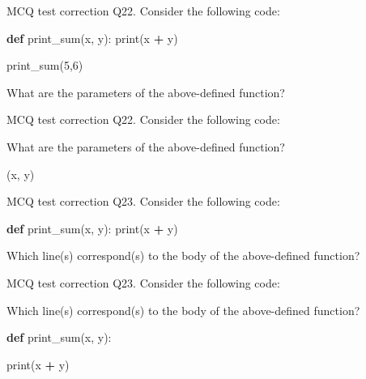 \documentclass[
  8pt,
  ignorenonframetext,
]{beamer}
\newenvironment{Shaded}{\begin{snugshade}}{\end{snugshade}}
\newcommand{\BuiltInTok}[1]{#1}
\newcommand{\DecValTok}[1]{\textcolor[rgb]{0.00,0.00,0.81}{#1}}
\newcommand{\KeywordTok}[1]{\textcolor[rgb]{0.13,0.29,0.53}{\textbf{#1}}}
\newcommand{\NormalTok}[1]{#1}
\newcommand{\OperatorTok}[1]{\textcolor[rgb]{0.81,0.36,0.00}{\textbf{#1}}}
\begin{document}
\begin{frame}[fragile]{MCQ test correction}
\protect\hypertarget{mcq-test-correction-42}{}
Q22. Consider the following code:

\begin{Shaded}
\begin{Highlighting}[]
\KeywordTok{def}\NormalTok{ print\_sum(x, y):}
    \BuiltInTok{print}\NormalTok{(x }\OperatorTok{+}\NormalTok{ y)}

\NormalTok{print\_sum(}\DecValTok{5}\NormalTok{,}\DecValTok{6}\NormalTok{)}
\end{Highlighting}
\end{Shaded}

What are the parameters of the above-defined function?
\end{frame}

\begin{frame}{MCQ test correction}
\protect\hypertarget{mcq-test-correction-43}{}
Q22. Consider the following code:

What are the parameters of the above-defined function?

(x, y)
\end{frame}

\begin{frame}[fragile]{MCQ test correction}
\protect\hypertarget{mcq-test-correction-44}{}
Q23. Consider the following code:

\begin{Shaded}
\begin{Highlighting}[]
\KeywordTok{def}\NormalTok{ print\_sum(x, y):}
    \BuiltInTok{print}\NormalTok{(x }\OperatorTok{+}\NormalTok{ y)}
\end{Highlighting}
\end{Shaded}

Which line(s) correspond(s) to the body of the above-defined function?
\end{frame}

\begin{frame}[fragile]{MCQ test correction}
\protect\hypertarget{mcq-test-correction-45}{}
Q23. Consider the following code:

Which line(s) correspond(s) to the body of the above-defined function?

\begin{Shaded}
\begin{Highlighting}[]
\KeywordTok{def}\NormalTok{ print\_sum(x, y):}
    
    \BuiltInTok{print}\NormalTok{(x }\OperatorTok{+}\NormalTok{ y)}
\end{Highlighting}
\end{Shaded}
\end{frame}
\end{document}

